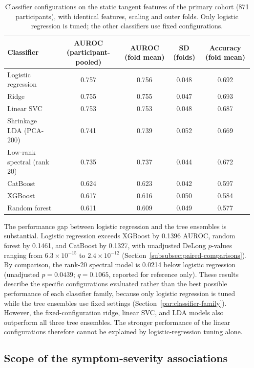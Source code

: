 \begin{table}[t]
\centering
\caption{Classifier configurations on the static tangent features of the primary cohort
(871 participants), with identical features, scaling and outer folds. Only logistic
regression is tuned; the other classifiers use fixed configurations.}
\label{tab:classifier-family}
\small
\setlength{\tabcolsep}{4pt}
\begin{tabular}{@{}lcccc@{}}
\toprule
Classifier & AUROC (participant-pooled) & AUROC (fold mean) & SD (folds) & Accuracy (fold mean) \\
\midrule
Logistic regression & 0.757 & 0.756 & 0.048 & 0.692 \\
Ridge & 0.755 & 0.755 & 0.047 & 0.693 \\
Linear SVC & 0.753 & 0.753 & 0.048 & 0.687 \\
Shrinkage LDA (PCA-200) & 0.741 & 0.739 & 0.052 & 0.669 \\
Low-rank spectral (rank 20) & 0.735 & 0.737 & 0.044 & 0.672 \\
CatBoost & 0.624 & 0.623 & 0.042 & 0.597 \\
XGBoost & 0.617 & 0.616 & 0.050 & 0.584 \\
Random forest & 0.611 & 0.609 & 0.049 & 0.577 \\
\bottomrule
\end{tabular}
\end{table}

The performance gap between logistic regression and the tree ensembles is substantial. Logistic regression exceeds XGBoost by 0.1396 AUROC, random forest by 0.1461, and CatBoost by 0.1327, with unadjusted DeLong $p$-values ranging from $6.3\times10^{-15}$ to $2.4\times10^{-12}$ (Section~\ref{subsubsec:paired-comparisons}). By comparison, the rank-20 spectral model is 0.0214 below logistic regression (unadjusted $p=0.0439$; $q=0.1065$, reported for reference only). These results describe the specific configurations evaluated rather than the best possible performance of each classifier family, because only logistic regression is tuned while the tree ensembles use fixed settings (Section~\ref{par:classifier-family}). However, the fixed-configuration ridge, linear SVC, and LDA models also outperform all three tree ensembles. The stronger performance of the linear configurations therefore cannot be explained by logistic-regression tuning alone.

\subsection{Scope of the symptom-severity associations}
\label{subsec:results-symptom-severity}

